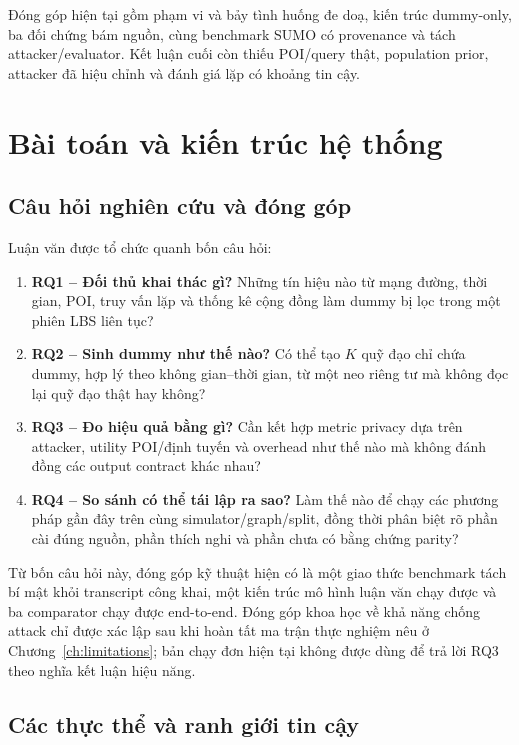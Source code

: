 \documentclass[12pt,a4paper,oneside]{report}
\begin{document}
Đóng góp hiện tại gồm phạm vi và bảy tình huống đe doạ, kiến trúc dummy-only, ba đối chứng bám nguồn, cùng benchmark SUMO có provenance và tách attacker/evaluator. Kết luận cuối còn thiếu POI/query thật, population prior, attacker đã hiệu chỉnh và đánh giá lặp có khoảng tin cậy.

\chapter{Bài toán và kiến trúc hệ thống}

\section{Câu hỏi nghiên cứu và đóng góp}

Luận văn được tổ chức quanh bốn câu hỏi:

\begin{enumerate}
  \item \textbf{RQ1 -- Đối thủ khai thác gì?} Những tín hiệu nào từ mạng đường, thời gian, POI, truy vấn lặp và thống kê cộng đồng làm dummy bị lọc trong một phiên LBS liên tục?
  \item \textbf{RQ2 -- Sinh dummy như thế nào?} Có thể tạo $K$ quỹ đạo chỉ chứa dummy, hợp lý theo không gian--thời gian, từ một neo riêng tư mà không đọc lại quỹ đạo thật hay không?
  \item \textbf{RQ3 -- Đo hiệu quả bằng gì?} Cần kết hợp metric privacy dựa trên attacker, utility POI/định tuyến và overhead như thế nào mà không đánh đồng các output contract khác nhau?
  \item \textbf{RQ4 -- So sánh có thể tái lập ra sao?} Làm thế nào để chạy các phương pháp gần đây trên cùng simulator/graph/split, đồng thời phân biệt rõ phần cài đúng nguồn, phần thích nghi và phần chưa có bằng chứng parity?
\end{enumerate}

Từ bốn câu hỏi này, đóng góp kỹ thuật hiện có là một giao thức benchmark tách bí mật khỏi transcript công khai, một kiến trúc mô hình luận văn chạy được và ba comparator chạy được end-to-end. Đóng góp khoa học về khả năng chống attack chỉ được xác lập sau khi hoàn tất ma trận thực nghiệm nêu ở Chương~\ref{ch:limitations}; bản chạy đơn hiện tại không được dùng để trả lời RQ3 theo nghĩa kết luận hiệu năng.

\section{Các thực thể và ranh giới tin cậy}
\end{document}
